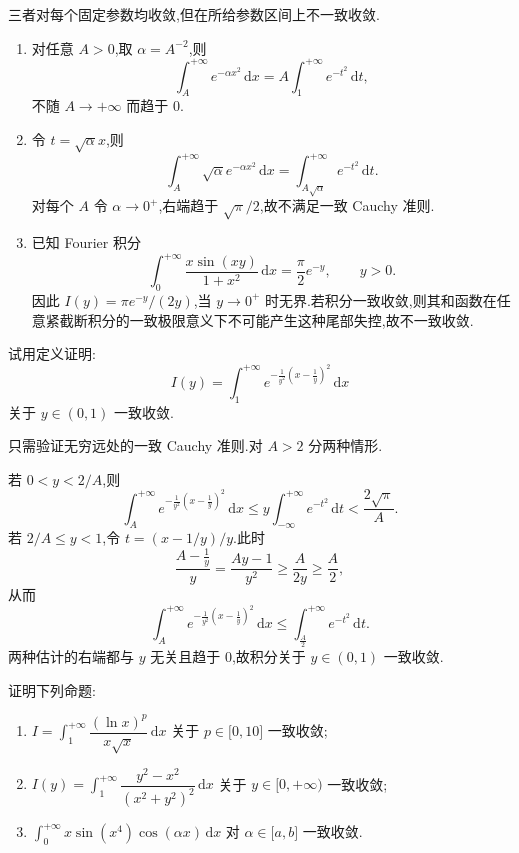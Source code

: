 \begin{solution}
    三者对每个固定参数均收敛,但在所给参数区间上不一致收敛.
    \begin{enumerate}
        \item 对任意 $A>0$,取 $\alpha=A^{-2}$,则
              \[
                  \int_A^{+\infty}e^{-\alpha x^2}\,\mathrm{d}x
                  =A\int_1^{+\infty}e^{-t^2}\,\mathrm{d}t,
              \]
              不随 $A\to+\infty$ 而趋于 $0$.
        \item 令 $t=\sqrt\alpha x$,则
              \[
                  \int_A^{+\infty}\sqrt\alpha e^{-\alpha x^2}\,\mathrm{d}x
                  =\int_{A\sqrt\alpha}^{+\infty}e^{-t^2}\,\mathrm{d}t.
              \]
              对每个 $A$ 令 $\alpha\to0^+$,右端趋于 $\sqrt\pi/2$,故不满足一致 Cauchy 准则.
        \item 已知 Fourier 积分
              \[
                  \int_0^{+\infty}\dfrac{x\sin(xy)}{1+x^2}\,\mathrm{d}x
                  =\dfrac{\pi}{2}e^{-y},
                  \qquad y>0.
              \]
              因此 $I(y)=\pi e^{-y}/(2y)$,当 $y\to0^+$ 时无界.若积分一致收敛,则其和函数在任意紧截断积分的一致极限意义下不可能产生这种尾部失控,故不一致收敛.
    \end{enumerate}
\end{solution}

\begin{example}
    试用定义证明:
    \[
        I(y)=\int_1^{+\infty}e^{-\frac{1}{y^2}(x-\frac{1}{y})^2}\,\mathrm{d}x
    \]
    关于 $y\in(0,1)$ 一致收敛.
\end{example}
\exampleblank

\begin{solution}
    只需验证无穷远处的一致 Cauchy 准则.对 $A>2$ 分两种情形.

    若 $0<y<2/A$,则
    \[
        \int_A^{+\infty}e^{-\frac{1}{y^2}(x-\frac{1}{y})^2}\,\mathrm{d}x
        \leq y\int_{-\infty}^{+\infty}e^{-t^2}\,\mathrm{d}t
        <\dfrac{2\sqrt\pi}{A}.
    \]
    若 $2/A\leq y<1$,令 $t=(x-1/y)/y$.此时
    \[
        \dfrac{A-\frac{1}{y}}{y}=\dfrac{Ay-1}{y^2}\geq\dfrac{A}{2y}\geq\dfrac{A}{2},
    \]
    从而
    \[
        \int_A^{+\infty}e^{-\frac{1}{y^2}(x-\frac{1}{y})^2}\,\mathrm{d}x
        \leq\int_{\frac{A}{2}}^{+\infty}e^{-t^2}\,\mathrm{d}t.
    \]
    两种估计的右端都与 $y$ 无关且趋于 $0$,故积分关于 $y\in(0,1)$ 一致收敛.
\end{solution}

\begin{example}
    证明下列命题:
    \begin{enumerate}
        \item $\displaystyle I=\int_1^{+\infty}\dfrac{(\ln x)^p}{x\sqrt{x}}\,\mathrm{d}x$ 关于 $p\in\lbrack0,10\rbrack$ 一致收敛;
        \item $\displaystyle I(y)=\int_1^{+\infty}\dfrac{y^2-x^2}{(x^2+y^2)^2}\,\mathrm{d}x$ 关于 $y\in\lbrack0,+\infty)$ 一致收敛;
        \item $\displaystyle \int_0^{+\infty}x\sin(x^4)\cos(\alpha x)\,\mathrm{d}x$ 对 $\alpha\in\lbrack a,b\rbrack$ 一致收敛.
    \end{enumerate}
\end{example}
\exampleblank

